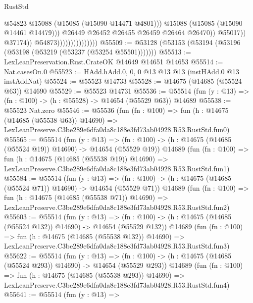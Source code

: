 \begin{lexlean}{RustStd}
\begin{coremodule}
                                                  @54823
                                                  @15088
                                                  (@15085 (@15090 @14471 @4801)))
                                                @15088
                                                (@15085 (@15090 @14461 @14479)))
                                              @26449
                                              @26452
                                              @26455
                                              @26459
                                              @26464
                                              @26470))
                                          @55017))
                                      @37174))
                                  @54873)))))))))))))))
@55509 := @53128 (@53153 (@53194 (@53196 (@53198 (@53219 (@53237 (@53254 @55501)))))))
@55513 := LexLeanPreservation.Rust.CrateOK @14649 @14651 @14653
@55514 := Nat.casesOn.{0}
@55523 := HAdd.hAdd.{0, 0, 0} @13 @13 @13 (instHAdd.{0} @13 instAddNat)
@55524 := @55523 @14733
@55528 := @14675 (@14685 (@55524 @63)) @14690
@55529 := @55523 @14731
@55536 := @55514 (fun (y : @13) => (fn : @100) -> (h : @55528) -> @14654 (@55529 @63)) @14689
@55538 := @55523 Nat.zero
@55546 := @55536
    (fun (fn : @100) =>
    fun (h : @14675 (@14685 (@55538 @63)) @14690) =>
    LexLeanPreserve.C3be289e6dfa0da8c188e3fd73ab04928.R53.RustStd.fun0)
@55565 := @55514
    (fun (y : @13) =>
    (fn : @100) -> (h : @14675 (@14685 (@55524 @19)) @14690) -> @14654 (@55529 @19))
    @14689
    (fun (fn : @100) =>
    fun (h : @14675 (@14685 (@55538 @19)) @14690) =>
    LexLeanPreserve.C3be289e6dfa0da8c188e3fd73ab04928.R53.RustStd.fun1)
@55584 := @55514
    (fun (y : @13) =>
    (fn : @100) -> (h : @14675 (@14685 (@55524 @71)) @14690) -> @14654 (@55529 @71))
    @14689
    (fun (fn : @100) =>
    fun (h : @14675 (@14685 (@55538 @71)) @14690) =>
    LexLeanPreserve.C3be289e6dfa0da8c188e3fd73ab04928.R53.RustStd.fun2)
@55603 := @55514
    (fun (y : @13) =>
    (fn : @100) -> (h : @14675 (@14685 (@55524 @132)) @14690) -> @14654 (@55529 @132))
    @14689
    (fun (fn : @100) =>
    fun (h : @14675 (@14685 (@55538 @132)) @14690) =>
    LexLeanPreserve.C3be289e6dfa0da8c188e3fd73ab04928.R53.RustStd.fun3)
@55622 := @55514
    (fun (y : @13) =>
    (fn : @100) -> (h : @14675 (@14685 (@55524 @293)) @14690) -> @14654 (@55529 @293))
    @14689
    (fun (fn : @100) =>
    fun (h : @14675 (@14685 (@55538 @293)) @14690) =>
    LexLeanPreserve.C3be289e6dfa0da8c188e3fd73ab04928.R53.RustStd.fun4)
@55641 := @55514
    (fun (y : @13) =>

\end{coremodule}
\end{lexlean}
